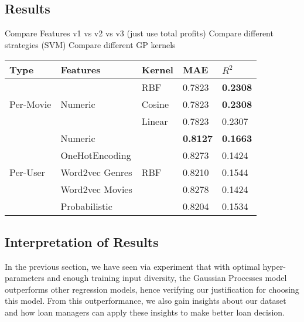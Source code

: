 \documentclass[a4paper]{article}
\theoremstyle{genius}
\begin{document}
\subsection{Results}
Compare Features v1 vs v2 vs v3 (just use total profits)
Compare different strategies (SVM)
Compare different GP kernels

\begin{center}
	\begin{tabular}{lllll}
		\hline
		Type & Features & Kernel & MAE & $R^{2}$ \\
		\hline
		\multirow{3}{*}{Per-Movie} &\multirow{3}{*}{Numeric}
		 & RBF & 0.7823 & \textbf{0.2308}\\
		& & Cosine & 0.7823 & \textbf{0.2308} \\
		& & Linear & 0.7823 & 0.2307 \\
		\hline
		\multirow{5}{*}{Per-User} & Numeric & \multirow{5}{*}{RBF} & \textbf{0.8127} & \textbf{0.1663} \\
		& OneHotEncoding & & 0.8273 & 0.1424 \\
		& Word2vec Genres & & 0.8210 & 0.1544 \\
		& Word2vec Movies & & 0.8278 & 0.1424 \\
		& Probabilistic   & & 0.8204 & 0.1534\\
		\hline
	\end{tabular}
\end{center}

\subsection{Interpretation of Results}
In the previous section, we have seen via experiment that with optimal hyper-parameters and enough training input diversity, the Gaussian Processes model outperforms other regression models, hence verifying our justification for choosing this model. From this outperformance, we also gain insights about our dataset and how loan managers can apply these insights to make better loan decision.
\end{document}

